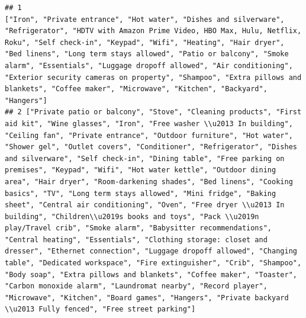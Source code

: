 \documentclass[
]{article}
\begin{document}
\begin{verbatim}
## 1                                                                                                                                                                                                                                                                                                                                                                                                                                                                                                                                                                                                                                                                                                                         ["Iron", "Private entrance", "Hot water", "Dishes and silverware", "Refrigerator", "HDTV with Amazon Prime Video, HBO Max, Hulu, Netflix, Roku", "Self check-in", "Keypad", "Wifi", "Heating", "Hair dryer", "Bed linens", "Long term stays allowed", "Patio or balcony", "Smoke alarm", "Essentials", "Luggage dropoff allowed", "Air conditioning", "Exterior security cameras on property", "Shampoo", "Extra pillows and blankets", "Coffee maker", "Microwave", "Kitchen", "Backyard", "Hangers"]
## 2 ["Private patio or balcony", "Stove", "Cleaning products", "First aid kit", "Wine glasses", "Iron", "Free washer \\u2013 In building", "Ceiling fan", "Private entrance", "Outdoor furniture", "Hot water", "Shower gel", "Outlet covers", "Conditioner", "Refrigerator", "Dishes and silverware", "Self check-in", "Dining table", "Free parking on premises", "Keypad", "Wifi", "Hot water kettle", "Outdoor dining area", "Hair dryer", "Room-darkening shades", "Bed linens", "Cooking basics", "TV", "Long term stays allowed", "Mini fridge", "Baking sheet", "Central air conditioning", "Oven", "Free dryer \\u2013 In building", "Children\\u2019s books and toys", "Pack \\u2019n play/Travel crib", "Smoke alarm", "Babysitter recommendations", "Central heating", "Essentials", "Clothing storage: closet and dresser", "Ethernet connection", "Luggage dropoff allowed", "Changing table", "Dedicated workspace", "Fire extinguisher", "Crib", "Shampoo", "Body soap", "Extra pillows and blankets", "Coffee maker", "Toaster", "Carbon monoxide alarm", "Laundromat nearby", "Record player", "Microwave", "Kitchen", "Board games", "Hangers", "Private backyard \\u2013 Fully fenced", "Free street parking"]

\end{verbatim}
\end{document}
